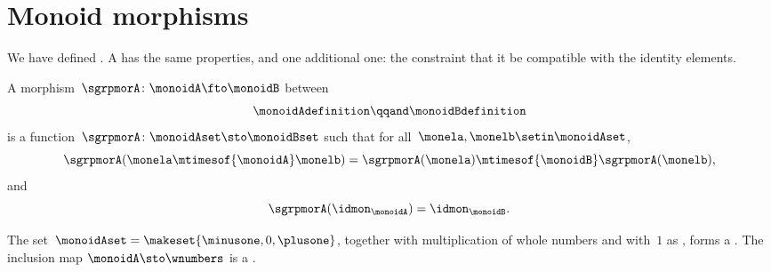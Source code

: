 
\section{Monoid morphisms}
We have defined .
A  has the same properties, and one additional one: the constraint that it be compatible with the identity elements.

\begin{marginfigure}
    \centering
    \caption{Compatibility with identity elements}
    \label{fig:monoid-morphism-diagram}
\end{marginfigure}


\begin{ctdefinition}
    \label{def:monoid-mor}
    A morphism~$\sgrpmorA\colon \monoidA \fto \monoidB$ between 
    \begin{equation}
        \monoidAdefinition
        \qqand
        \monoidBdefinition
    \end{equation}
    is a function~$\sgrpmorA \colon \monoidAset \sto \monoidBset$ such that for all~$\monela, \monelb\setin \monoidAset$,
    \begin{equation}
        \label{eq:mon-mor-comp}
        \sgrpmorA (\monela \mtimesof{\monoidA} \monelb) = \sgrpmorA (\monela) \mtimesof{\monoidB} \sgrpmorA(\monelb),
    \end{equation}
    and
    \begin{equation}
        \label{eq:mon-id-comp}
        \sgrpmorA (\idmon_\monoidA) = \idmon_{\monoidB}.
    \end{equation}
\end{ctdefinition}

\begin{example}
    The set~$\monoidAset = \makeset{ \minusone, 0, \plusone }$, together with multiplication of whole numbers and with~$1$ as , forms a .
    The inclusion map $\monoidA \sto \wnumbers$ is a .
\end{example}

